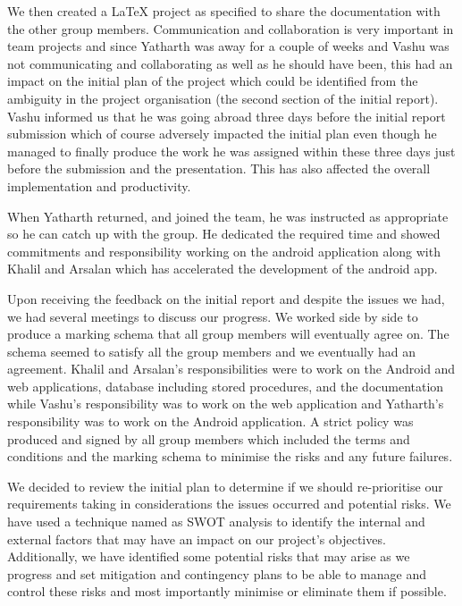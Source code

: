 \documentclass{article}
\begin{document}
We then created a LaTeX project as specified to share the documentation with the other group members. Communication and collaboration is very important in team projects and since Yatharth was away for a couple of weeks and Vashu was not communicating and collaborating as well as he should have been, this had an impact on the initial plan of the project which could be identified from the ambiguity in the project organisation (the second section of the initial report). Vashu informed us that he was going abroad three days before the initial report submission which of course adversely impacted the initial plan even though he managed to finally produce the work he was assigned within these three days just before the submission and the presentation. This has also affected the overall implementation and productivity. \par
When Yatharth returned, and joined the team, he was instructed as appropriate so he can catch up with the group. He dedicated the required time and showed commitments and responsibility working on the android application along with Khalil and Arsalan which has accelerated the development of the android app. \par
Upon receiving the feedback on the initial report and despite the issues we had, we had several meetings to discuss our progress. We worked side by side to produce a marking schema that all group members will eventually agree on. The schema seemed to satisfy all the group members and we eventually had an agreement. Khalil and Arsalan’s responsibilities were to work on the Android and web applications, database including stored procedures, and the documentation while Vashu’s responsibility was to work on the web application and Yatharth’s responsibility was to work on the Android application. A strict policy was produced and signed by all group members which included the terms and conditions and the marking schema to minimise the risks and any future failures. \par
We decided to review the initial plan to determine if we should re-prioritise our requirements taking in considerations the issues occurred and potential risks. We have used a technique named as SWOT analysis to identify the internal and external factors that may have an impact on our project’s objectives. Additionally, we have identified some potential risks that may arise as we progress and set mitigation and contingency plans to be able to manage and control these risks and most importantly minimise or eliminate them if possible. \par
\end{document}
